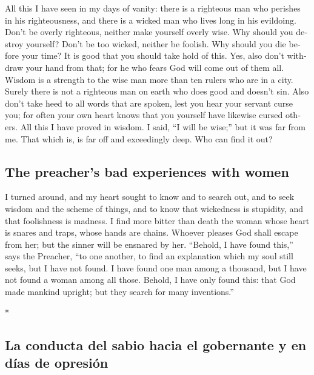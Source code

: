 \begin{paracol}{2}
\begin{otherlanguage}{english}
 All this I have seen in my days of vanity: there is a
righteous man who perishes in his righteousness, and there is a wicked
man who lives long in his evildoing.  Don't be overly
righteous, neither make yourself overly wise. Why should you destroy
yourself?  Don't be too wicked, neither be foolish. Why
should you die before your time?  It is good that you
should take hold of this. Yes, also don't withdraw your hand from that;
for he who fears God will come out of them all.  Wisdom
is a strength to the wise man more than ten rulers who are in a city.
 Surely there is not a righteous man on earth who does
good and doesn't sin.  Also don't take heed to all words
that are spoken, lest you hear your servant curse you; 
for often your own heart knows that you yourself have likewise cursed
others.  All this I have proved in wisdom. I said, ``I
will be wise;'' but it was far from me.  That which is,
is far off and exceedingly deep. Who can find it out?

\hypertarget{the-preachers-bad-experiences-with-women}{%
\subsection{The preacher's bad experiences with
women}\label{the-preachers-bad-experiences-with-women}}

 I turned around, and my heart sought to know and to
search out, and to seek wisdom and the scheme of things, and to know
that wickedness is stupidity, and that foolishness is madness.
 I find more bitter than death the woman whose heart is
snares and traps, whose hands are chains. Whoever pleases God shall
escape from her; but the sinner will be ensnared by her. 
``Behold, I have found this,'' says the Preacher, ``to one another, to
find an explanation  which my soul still seeks, but I
have not found. I have found one man among a thousand, but I have not
found a woman among all those.  Behold, I have only found
this: that God made mankind upright; but they search for many
inventions.''

\end{otherlanguage}

\switchcolumn[0]*

\hypertarget{la-conducta-del-sabio-hacia-el-gobernante-y-en-duxedas-de-opresiuxf3n}{%
\subsection{La conducta del sabio hacia el gobernante y en días de
opresión}\label{la-conducta-del-sabio-hacia-el-gobernante-y-en-duxedas-de-opresiuxf3n}}


\end{paracol}
